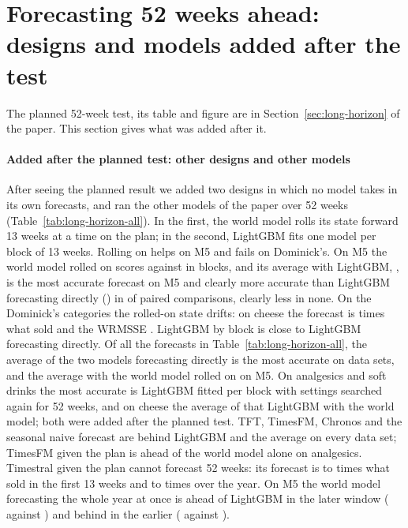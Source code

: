 \ifsupplement\section{Forecasting 52 weeks ahead: designs and models added after the test}
\label{sec:long-horizon-more}
The planned 52-week test, its table and figure are in Section~\ref{sec:long-horizon} of the paper. This section
gives what was added after it.
\fi

\paragraph{Added after the planned test: other designs and other models}
After seeing the planned result we added two designs in which no model takes in
its own forecasts, and ran the other models of the paper over 52 weeks
(Table~\ref{tab:long-horizon-all}). In the first, the world model rolls its
state forward 13 weeks at a time on the plan; in the second, LightGBM fits one
model per block of 13 weeks. Rolling on helps on M5 and fails on Dominick's. On M5
the world model rolled on scores \lhMfiveWmRollon{} against \lhMfiveWmBlocks{} in
blocks, and its average with LightGBM, \lhMfiveAvgRollon, is the most accurate
forecast on M5 and clearly more accurate than LightGBM forecasting directly
(\lhMfiveLgbDirect) in \lhMfiveAvgRollonLgbBetter{} of
\lhMfiveAvgRollonLgbN{} paired comparisons, clearly less in none. On the
Dominick's categories the rolled-on state drifts: on cheese the forecast is
\lhRollonCheeseFa{} times what sold and the WRMSSE \lhRollonCheese. LightGBM by
block is close to LightGBM forecasting directly. Of all the forecasts in Table~\ref{tab:long-horizon-all}, the average of the
two models forecasting directly is the most accurate on \lhAllLowestAvgDirect{}
data sets, and the average with the world model rolled on on M5. On analgesics
and soft drinks the most accurate is LightGBM fitted per block with settings
searched again for 52 weeks, and on cheese the average of that LightGBM with the
world model; both were added after the planned test. TFT, TimesFM, Chronos and the seasonal naive forecast are
behind LightGBM and the average on every data set; TimesFM given the plan is
ahead of the world model alone on analgesics. Timestral given the plan cannot
forecast 52 weeks: its forecast is \lhTimestralFaOneLo{} to \lhTimestralFaOneHi{}
times what sold in the first 13 weeks and \lhTimestralFaLo{} to
\lhTimestralFaHi{} times over the year. On M5 the world model forecasting the whole year at once is ahead of LightGBM in the later
window (\lhMfiveWmDirLate{} against \lhMfiveLgbDirLate) and behind in the earlier (\lhMfiveWmDirEarly{}
against \lhMfiveLgbDirEarly).

